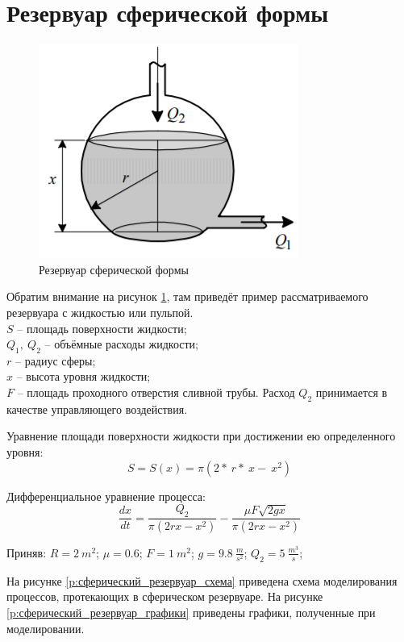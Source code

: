 \documentclass[a4paper, 12pt]{article}
\begin{document}
\section{Резервуар сферической формы}

\begin{figure}[h!]
	\centering
	\includegraphics[scale=0.8]{example_3}
	\caption{ Резервуар сферической формы  }
	\label{p:Резервуар_сфера}
\end{figure}

Обратим внимание на рисунок \ref{p:Резервуар_сфера}, там приведёт пример рассматриваемого резервуара с жидкостью или пульпой. \\
$S$ -- площадь поверхности жидкости; \\
$Q_1,\ Q_2$  – объёмные расходы жидкости; \\ 
$r$ -- радиус сферы; \\
$x$ -- высота уровня жидкости; \\
$F$ – площадь проходного отверстия сливной трубы. Расход $Q_2$ принимается в качестве управляющего воздействия. 

Уравнение площади поверхности жидкости при достижении ею определенного уровня:
\[ S = S(x) = \pi(2\ast\ r\ast\ x-\ x^2) \]

Дифференциальное уравнение процесса:
\[ \frac{dx}{dt}=\frac{Q_2}{\pi\left(2rx-x^2\right)}-\frac{\mu F\sqrt{2gx}}{\pi\left(2rx-x^2\right)} \]

Приняв:
$R = 2 \ m^2$; 
$\mu = 0.6 $;  
$F = 1 \ m^2$;  
$g = 9.8 \ \frac{m}{s^2}$; 
$Q_2 = 5 \ \frac{m^3}{s}$; 

На рисунке \ref{p:сферический_резервуар_схема} приведена схема моделирования процессов, протекающих в сферическом резервуаре. На рисунке \ref{p:сферический_резервуар_графики} приведены графики, полученные при моделировании. 
\end{document}
